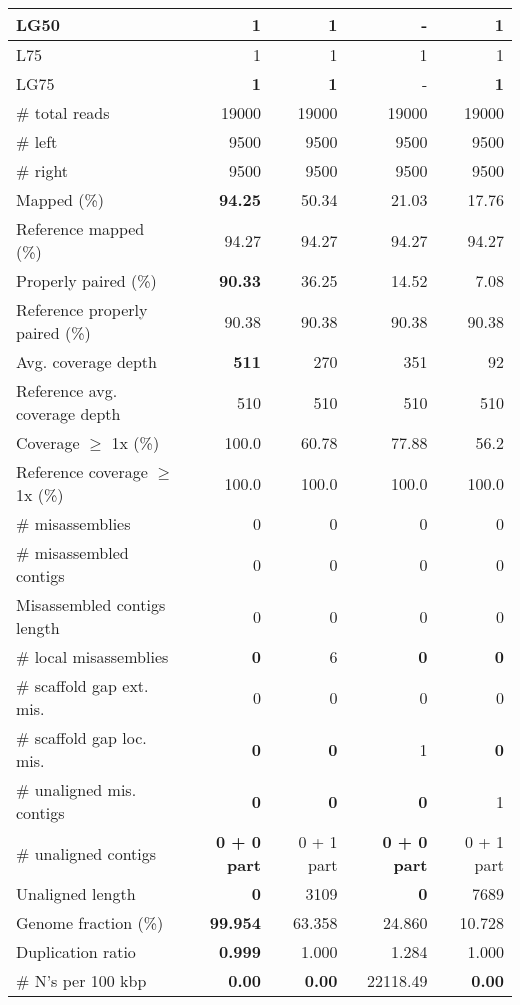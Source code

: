\documentclass[12pt,a4paper]{article}
\begin{document}
\begin{table}[ht]
\begin{center}
\begin{tabular}{|l*{4}{|r}|}
LG50 & {\bf 1} & {\bf 1} & - & {\bf 1} \\ \hline
L75 & 1 & 1 & 1 & 1 \\ \hline
LG75 & {\bf 1} & {\bf 1} & - & {\bf 1} \\ \hline
\# total reads & 19000 & 19000 & 19000 & 19000 \\ \hline
\# left & 9500 & 9500 & 9500 & 9500 \\ \hline
\# right & 9500 & 9500 & 9500 & 9500 \\ \hline
Mapped (\%) & {\bf 94.25} & 50.34 & 21.03 & 17.76 \\ \hline
Reference mapped (\%) & 94.27 & 94.27 & 94.27 & 94.27 \\ \hline
Properly paired (\%) & {\bf 90.33} & 36.25 & 14.52 & 7.08 \\ \hline
Reference properly paired (\%) & 90.38 & 90.38 & 90.38 & 90.38 \\ \hline
Avg. coverage depth & {\bf 511} & 270 & 351 & 92 \\ \hline
Reference avg. coverage depth & 510 & 510 & 510 & 510 \\ \hline
Coverage $\geq$ 1x (\%) & 100.0 & 60.78 & 77.88 & 56.2 \\ \hline
Reference coverage $\geq$ 1x (\%) & 100.0 & 100.0 & 100.0 & 100.0 \\ \hline
\# misassemblies & 0 & 0 & 0 & 0 \\ \hline
\# misassembled contigs & 0 & 0 & 0 & 0 \\ \hline
Misassembled contigs length & 0 & 0 & 0 & 0 \\ \hline
\# local misassemblies & {\bf 0} & 6 & {\bf 0} & {\bf 0} \\ \hline
\# scaffold gap ext. mis. & 0 & 0 & 0 & 0 \\ \hline
\# scaffold gap loc. mis. & {\bf 0} & {\bf 0} & 1 & {\bf 0} \\ \hline
\# unaligned mis. contigs & {\bf 0} & {\bf 0} & {\bf 0} & 1 \\ \hline
\# unaligned contigs & {\bf 0 + 0 part} & 0 + 1 part & {\bf 0 + 0 part} & 0 + 1 part \\ \hline
Unaligned length & {\bf 0} & 3109 & {\bf 0} & 7689 \\ \hline
Genome fraction (\%) & {\bf 99.954} & 63.358 & 24.860 & 10.728 \\ \hline
Duplication ratio & {\bf 0.999} & 1.000 & 1.284 & 1.000 \\ \hline
\# N's per 100 kbp & {\bf 0.00} & {\bf 0.00} & 22118.49 & {\bf 0.00} \\ \hline

\end{tabular}
\end{center}
\end{table}
\end{document}
